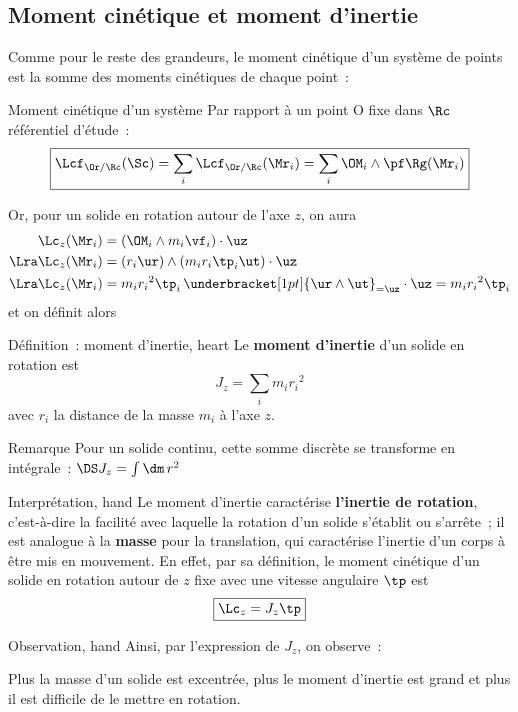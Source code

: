 \documentclass[../main/main.tex]{subfiles}
\begin{document}
\subsection{Moment cinétique et moment d'inertie}
Comme pour le reste des grandeurs, le moment cinétique d'un système de points
est la somme des moments cinétiques de chaque point~:
\begin{tdefi}{Moment cinétique d'un système}
    Par rapport à un point O fixe dans $\Rc$ référentiel d'étude~:
    \[\boxed{\Lcf_{\Or/\Rc}(\Sc) = \sum_i\Lcf_{\Or/\Rc}(\Mr_i)
        = \sum_i \OM_i\wedge\pf\Rg(\Mr_i)}
    \]
\end{tdefi}
Or, pour un solide en rotation autour de l'axe $z$, on aura
\begin{align*}
    \Lc_z(\Mr_i) &= (\OM_i\wedge m_i\vf_i)\cdot\uz
    \\\Lra
    \Lc_z(\Mr_i) &= (r_i\ur)\wedge(m_ir_i\tp_i\ut)\cdot\uz
    \\\Lra
    \Lc_z(\Mr_i) &= m_ir_i{}^2\tp_i\,
        \underbracket[1pt]{\ur\wedge\ut}_{=\uz}\cdot\uz = m_ir_i{}^2\tp_i
\end{align*}
 \smallbreak
et on définit alors
\begin{tdefi}{Définition~: moment d'inertie, heart}
    Le \textbf{moment d'inertie} d'un solide en rotation est
    \[\boxed{J_z = \sum_i m_ir_i{}^2}\]
    avec $r_i$ la distance de la masse $m_i$ à l'axe $z$.
\end{tdefi}
\begin{rrema}{Remarque}
    Pour un solide continu, cette somme discrète se transforme en intégrale~:
    $\DS J_z = \int \dm\,r^2$
\end{rrema}
\begin{timpo}{Interprétation, hand}
    Le moment d'inertie caractérise \textbf{l'inertie de rotation}, c'est-à-dire
    la facilité avec laquelle la rotation d'un solide s'établit ou s'arrête~; il
    est analogue à la \textbf{masse} pour la translation, qui caractérise
    l'inertie d'un corps à être mis en mouvement. En effet, par sa définition,
    le moment cinétique d'un solide en rotation autour de $z$ fixe avec une
    vitesse angulaire $\tp$ est
    \[\boxed{\Lc_z = J_z\tp}\]
\end{timpo}
\begin{tror}{Observation, hand}
    Ainsi, par l'expression de $J_z$, on observe~:
    \begin{center}
        \begin{bfseries}
            Plus la masse d'un solide est excentrée, plus le moment d'inertie
            est grand et plus il est difficile de le mettre en rotation.
        \end{bfseries}
    \end{center}
\end{tror}
\end{document}
